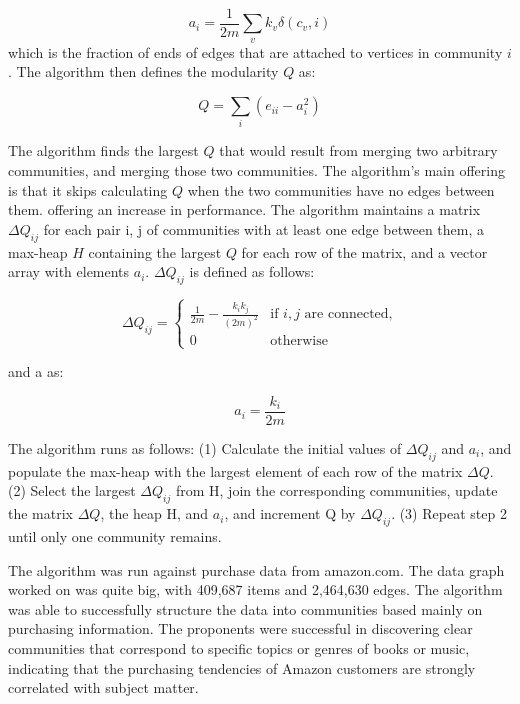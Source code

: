 \begin{equation}
	a_i = \frac{1}{2m} \sum_{v}{k_v\delta(c_v,i)}
\end{equation}which is the fraction of ends of edges that are attached to vertices in community $i$. The algorithm then defines the modularity $Q$ as:

\begin{equation}
	Q = \sum_{i}({e_{ii}-a_i^2})
\end{equation}

The algorithm finds the largest $Q$ that would result from merging two arbitrary communities, and merging those two communities. The algorithm's main offering is that it skips calculating $Q$ when the two communities have no edges between them. offering an increase in performance. The algorithm maintains a matrix $\Delta Q_{ij}$ for each pair i, j of communities with at least one edge between them, a max-heap $H$ containing the largest $Q$ for each row of the matrix, and a vector array with elements $a_{i}$. $\Delta Q_{ij}$ is defined as follows:

\begin{equation}
	\Delta Q_{ij} =
	\begin {cases}
	\frac{1}{2m}-\frac{k_ik_j}{(2m)^2} &\text{if }i, j\text{ are connected,}
	\\ 0 & \text{otherwise}
\end{cases}
\end{equation}

and a as:

\begin{equation}
	a_i = \frac{k_i}{2m}
\end{equation}

The algorithm runs as follows:
(1) Calculate the initial values of $\Delta Q_{ij}$ and $a_{i}$, and populate the max-heap with the largest element of each row of the matrix $\Delta Q$.
(2) Select the largest $\Delta Q_{ij}$ from H, join the corresponding
communities, update the matrix $\Delta Q$, the heap H, and $a_{i}$, and increment Q by $\Delta Q_{ij}$.
(3) Repeat step 2 until only one community remains.

The algorithm was run against purchase data from amazon.com. The data graph worked on was quite big, with 409,687 items and 2,464,630 edges. The algorithm was able to successfully structure the data into communities based mainly on purchasing information. The proponents were successful in discovering clear communities that correspond to specific topics or genres of books or music, indicating that the purchasing tendencies of Amazon customers are strongly correlated with subject matter.

